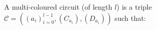 \documentclass[preview]{standalone}
\begin{document}
\begin{center}
\raggedright A multi-coloured circuit (of length $l$) is a triple $\mathcal{C} = ((a_i)_{i=0}^{l-1}, (C_{a_i}), (D_{a_i}))$ such that:
\end{center}
\end{document}
